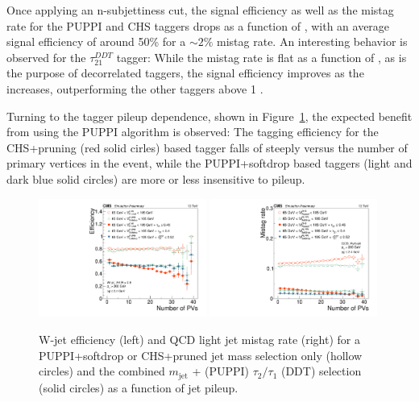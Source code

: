 Once applying an n-subjettiness cut, the signal efficiency as well as the mistag rate for the PUPPI \nsubj and CHS \nsubj taggers drops as a function of \PT, with an average signal efficiency of around 50\% for a $\sim 2\%$ mistag rate. An interesting behavior is observed for the $\tau_{21}^{DDT}$ tagger: While the mistag rate is flat as a function of \PT, as is the purpose of decorrelated taggers, the signal efficiency improves as the \PT increases, outperforming the other taggers above 1 \TeV. \par
Turning to the tagger pileup dependence, shown in Figure~\ref{fig:searchII:effvspu}, the expected benefit from using the PUPPI algorithm is observed: The tagging efficiency for the CHS+pruning (red solid cirles) based tagger falls of steeply versus the number of primary vertices in the event, while the PUPPI+softdrop based taggers (light and dark blue solid circles) are more or less insensitive to pileup.


\begin{figure}[h!]
\centering
\includegraphics[width=0.49\textwidth]{figures/vtagging/JME-16-003/BoostedW/WtagSigEffvsNPV.pdf}
\includegraphics[width=0.49\textwidth]{figures/vtagging/JME-16-003/BoostedW/QCDBkgEffvsNPV.pdf}
\caption{W-jet efficiency (left) and QCD light jet mistag rate (right) for a PUPPI+softdrop or CHS+pruned jet mass selection only (hollow circles) and the combined $m_{\mathrm{jet}}$ + (PUPPI) $\tau_2/\tau_1$ (DDT) selection (solid circles) as a function of jet pileup.}
\label{fig:searchII:effvspu}
\end{figure}

